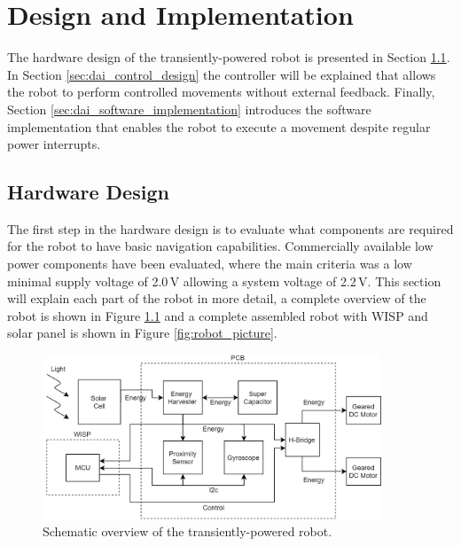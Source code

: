 \chapter{Design and Implementation}
\label{chp:design_and_implementation}

The hardware design of the transiently-powered robot is presented in Section \ref{sec:dai_hardware_design}.
In Section \ref{sec:dai_control_design} the controller will be explained that allows the robot to perform controlled movements without external feedback.
Finally, Section \ref{sec:dai_software_implementation} introduces the software implementation that enables the robot to execute a movement despite regular power interrupts. 

\section{Hardware Design}
\label{sec:dai_hardware_design}
The first step in the hardware design is to evaluate what components are required for the robot to have basic navigation capabilities. 
Commercially available low power components have been evaluated, where the main criteria was a low minimal supply voltage of 2.0\,V allowing a system voltage of 2.2\,V.
This section will explain each part of the robot in more detail, a complete overview of the robot is shown in Figure \ref{fig:robot_overview} and a complete assembled robot with WISP and solar panel is shown in Figure \ref{fig:robot_picture}.

\vspace{1em}
\begin{figure}[h!]
	\centering
	\includegraphics[width=0.9\textwidth]{pics/schematic_robot_v2.png}
	\caption{Schematic overview of the transiently-powered robot.}
	\label{fig:robot_overview}
\end{figure}

